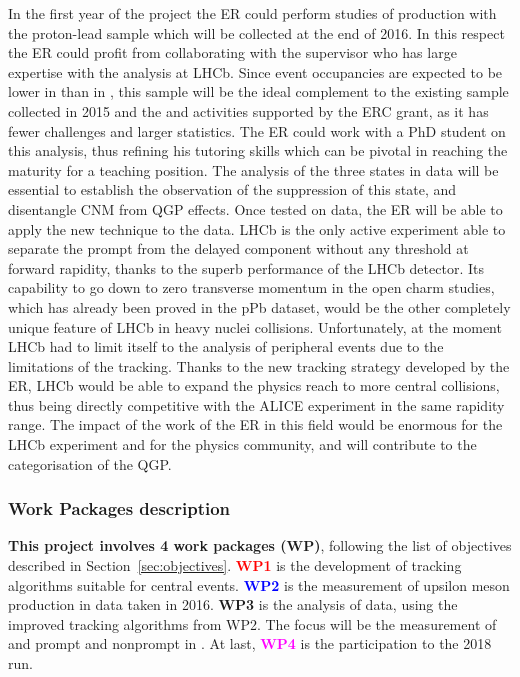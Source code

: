 \documentclass[a4paper,11pt]{article}
\newcommand{\ER}{ER\xspace}
\newcommand{\supervisor}{the supervisor\xspace}
\begin{document}
In the first year of the project the \ER could perform studies of \PgU
production with the proton-lead sample which will be collected at the
end of 2016. In this respect the \ER could profit from collaborating
with \supervisor who has large expertise with the \PgU analysis at
LHCb. Since event occupancies are expected to be lower in \pPb than in
\PbPb, this sample will be the ideal complement to the existing \PbPb
sample collected in 2015 and the \JPsi and \psiP activities
supported by the ERC grant, as it has fewer challenges and larger
statistics. The \ER could work with a PhD student on this analysis,
thus refining his tutoring skills which can be pivotal in reaching the
maturity for a teaching position.  The analysis of the three \PgUn
states in \pPb data will be essential to establish the observation of
the suppression of this state, and disentangle CNM from QGP effects.
Once tested on \pPb data, the \ER will be able to apply the new
technique to the \PbPb data.  LHCb is the only active experiment able
to separate the prompt from the delayed component without any \pt threshold at forward rapidity, thanks to the superb
performance of the LHCb detector. Its capability to go down to zero
transverse momentum in the open charm studies, which has already been
proved in the pPb dataset, would be the other completely unique
feature of LHCb in heavy nuclei collisions. Unfortunately, at the
moment LHCb had to limit itself to the analysis of peripheral events
due to the limitations of the tracking. Thanks to the new tracking
strategy developed by the \ER, LHCb would be able to expand the
physics reach to more central collisions, thus being directly
competitive with the ALICE experiment in the same rapidity range. The
impact of the work of the \ER in this field would be enormous for the
LHCb experiment and for the physics community, and will contribute to
the categorisation of the QGP.

\subsubsection*{Work Packages description}

\textbf{This project involves 4 work packages (WP)}, following the list of objectives described in Section~\ref{sec:objectives}. \textbf{\textcolor{red}{WP1}} is the development of tracking algorithms suitable for central events. \textbf{\textcolor{blue}{WP2}} is the measurement of upsilon meson production in \pPb data taken in 2016. \textbf{\textcolor{green!50!black}{WP3}} is the analysis of \pbpb data, using the improved tracking algorithms from WP2. The focus will be the measurement of \Dz and prompt and nonprompt \Jpsi in \pbpb. At last, \textbf{\textcolor{magenta}{WP4}} is the participation to the 2018 \PbPb run.
\end{document}
